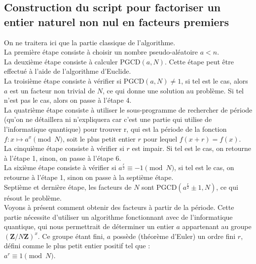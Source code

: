 \documentclass[12pt]{article}
\begin{document}
\subsection{Construction du script pour factoriser un entier naturel non nul en facteurs premiers}
On ne traitera ici que la partie classique de l'algorithme.
\\
La première étape consiste à choisir un nombre pseudo-aléatoire $a<n$.
\\
La deuxième étape consiste à calculer PGCD$(a, N)$. Cette étape peut être effectué à l'aide de l'algorithme d'Euclide.
\\
La troisième étape consiste à vérifier si PGCD$(a, N)\neq 1$, si tel est le cas, alors $a$ est un facteur non trivial de $N$, ce qui donne une solution au problème. Si tel n'est pas le cas, alors on passe à l'étape 4.
\\
La quatrième étape consiste à utiliser le sous-programme de rechercher de période (qu'on ne détaillera ni n'expliquera car c'est une partie qui utilise de l'informatique quantique) pour trouver r, qui est la période de la fonction $f:x \mapsto a^x \pmod N$, soit le plus petit entier $r$ pour lequel $f(x+r)=f(x)$.
\\
La cinquième étape consiste à vérifier si $r$ est impair. Si tel est le cas, on retourne à l'étape 1, sinon, on passe à l'étape 6.
\\
La sixième étape consiste à vérifier si $a^{\frac{r}{2}} \equiv -1 \pmod N$, si tel est le cas, on retourne à l'étape 1, sinon on passe à la septième étape.
\\
Septième et dernière étape, les facteurs de $N$ sont PGCD$(a^{\frac{r}{2}} \pm 1, N)$, ce qui résout le problème. 
\\
Voyons à présent comment obtenir des facteurs à partir de la période.
Cette partie nécessite d'utiliser un algorithme fonctionnant avec de l'informatique quantique, qui nous permettrait de déterminer un entier $a$ appartenant au groupe $(\textbf{Z}/N\textbf{Z})^x$. Ce groupe étant fini, $a$ possède (théorème d'Euler) un ordre fini $r$, défini comme le plus petit entier positif tel que : 
\\
$a^r \equiv 1 \pmod N$.
\end{document}
